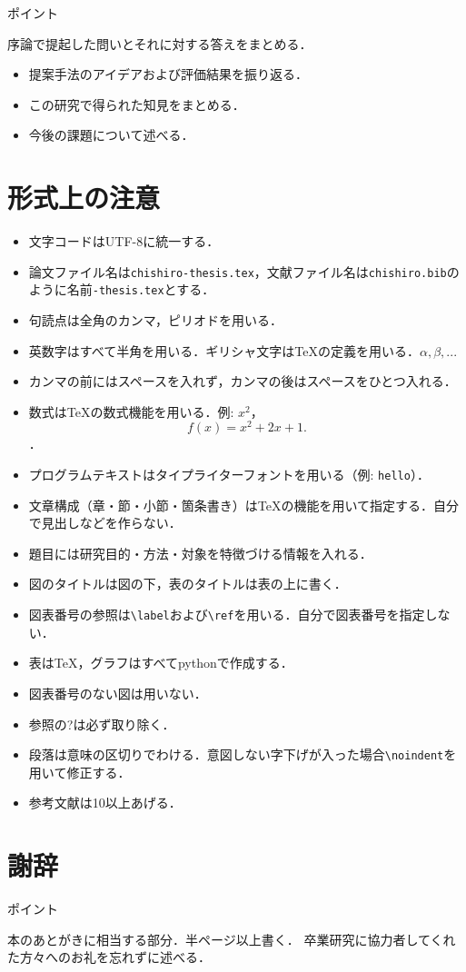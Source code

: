 \documentclass[a4j,11pt,report]{jsbook}
\newcommand{\point}[1]{
\begin{itembox}[l]{ポイント}
#1
\end{itembox}
}
\begin{document}
\point{
序論で提起した問いとそれに対する答えをまとめる．
\begin{itemize}
\item 提案手法のアイデアおよび評価結果を振り返る．
\item この研究で得られた知見をまとめる．
\item 今後の課題について述べる．
\end{itemize}
}




\appendix

\chapter{形式上の注意}

\begin{itemize}
\item 文字コードはUTF-8に統一する．
\item 論文ファイル名は\texttt{chishiro-thesis.tex}，文献ファイル名は\texttt{chishiro.bib}のように名前\texttt{-thesis.tex}とする．
\item 句読点は全角のカンマ，ピリオドを用いる．
\item 英数字はすべて半角を用いる．ギリシャ文字は{\TeX}の定義を用いる．$\alpha, \beta, ...$
\item カンマの前にはスペースを入れず，カンマの後はスペースをひとつ入れる．
\item 数式は{\TeX}の数式機能を用いる．例: $x^2$，\[f(x) = x^2 + 2x + 1.\]．
\item プログラムテキストはタイプライターフォントを用いる（例: \texttt{hello}）．
\item 文章構成（章・節・小節・箇条書き）は{\TeX}の機能を用いて指定する．自分で見出しなどを作らない．
\item 題目には研究目的・方法・対象を特徴づける情報を入れる．
\item 図のタイトルは図の下，表のタイトルは表の上に書く．
\item 図表番号の参照は\verb#\label#および\verb#\ref#を用いる．自分で図表番号を指定しない．
\item 表は{\TeX}，グラフはすべてpythonで作成する．
\item 図表番号のない図は用いない．
\item 参照の?は必ず取り除く．
\item 段落は意味の区切りでわける．意図しない字下げが入った場合\verb#\noindent#を用いて修正する．
\item 参考文献は10以上あげる．
\end{itemize}


\chapter*{謝辞 \label{ch:acknowledgement}}
\thispagestyle{empty}
\point{
本のあとがきに相当する部分．半ページ以上書く．
卒業研究に協力者してくれた方々へのお礼を忘れずに述べる．
}
\end{document}
